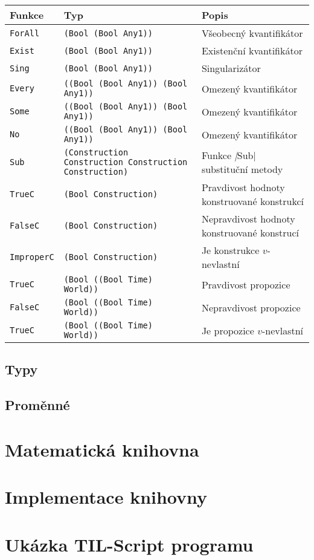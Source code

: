 \begin{table}
    \begin{tabular}{ l l l }
        \hline
        Funkce  &  Typ  &  Popis \\
        \hline
        \lstinline|ForAll| & \lstinline|(Bool (Bool Any1))| & Všeobecný kvantifikátor \\
        \lstinline|Exist|  & \lstinline|(Bool (Bool Any1))| & Existenční kvantifikátor \\
        \lstinline|Sing|   & \lstinline|(Bool (Bool Any1))| & Singularizátor \\
        \lstinline|Every|  & \lstinline|((Bool (Bool Any1)) (Bool Any1))| & Omezený kvantifikátor \\
        \lstinline|Some|   & \lstinline|((Bool (Bool Any1)) (Bool Any1))| & Omezený kvantifikátor \\
        \lstinline|No|     & \lstinline|((Bool (Bool Any1)) (Bool Any1))| & Omezený kvantifikátor \\
        \lstinline|Sub|    & \lstinline|(Construction Construction Construction Construction)| &
        Funkce \textit|Sub| substituční metody \\
        \lstinline|TrueC|  & \lstinline|(Bool Construction)| & Pravdivost hodnoty konstruované konstrukcí \\
        \lstinline|FalseC| & \lstinline|(Bool Construction)| & Nepravdivost hodnoty konstruované konstrucí \\
        \lstinline|ImproperC|     & \lstinline|(Bool Construction)| & Je konstrukce $v$-nevlastní \\
        \lstinline|TrueC|  & \lstinline|(Bool ((Bool Time) World))| & Pravdivost propozice \\
        \lstinline|FalseC| & \lstinline|(Bool ((Bool Time) World))| & Nepravdivost propozice \\
        \lstinline|TrueC|  & \lstinline|(Bool ((Bool Time) World))| & Je propozice $v$-nevlastní \\
    \end{tabular}
\end{table}

\subsection{Typy}

\subsection{Proměnné}

\section{Matematická knihovna}

\section{Implementace knihovny}

\section{Ukázka TIL-Script programu}

\endinput

